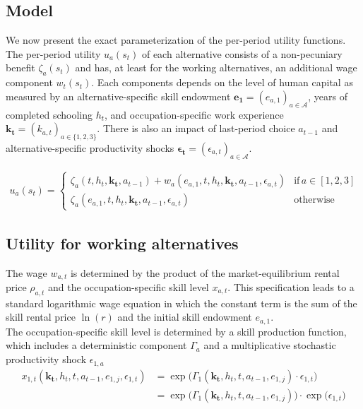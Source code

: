 \subsection{Model}\label{Appendix model}
We now present the exact parameterization of the per-period utility functions. The per-period utility $u_a(s_t)$ of each alternative consists of a non-pecuniary benefit $\zeta_a(s_t)$ and has, at least for the working alternatives, an additional wage component $w_t(s_t)$. Each components depends on the level of human capital as measured by an alternative-specific skill endowment $\bm{e_1} = \left(e_{a,1}\right)_{a\in\mathcal{A}}$, years of completed schooling $h_t$, and occupation-specific work experience $\bm{k_t} = \left(k_{a,t}\right)_{a\in\{1, 2, 3\}}$. There is also an impact of last-period choice $a_{t -1}$ and alternative-specific productivity shocks
$\bm{\epsilon_t} = \left(\epsilon_{a,t}\right)_{a\in\mathcal{A}}$.

\begin{align*}
u_a(s_t) =
\begin{cases}
    \zeta_a(t, h_t, \bm{k_t}, a_{t -1})  + w_a(e_{a,1}, t, h_t, \bm{k_t}, a_{t -1}, \epsilon_{a,t})              & \text{if}\, a \in [1, 2, 3]  \\
    \zeta_a(e_{a,1}, t, h_t, \bm{k_t}, a_{t -1}, \epsilon_{a,t})                                    & \text{otherwise}
\end{cases}
\end{align*}
\subsection{Utility for working alternatives}
The wage $w_{a,t}$ is determined by the product of the market-equilibrium rental price $\rho_{a,t}$ and the occupation-specific skill level $x_{a,t}$. This specification leads to a standard logarithmic wage equation in which the constant term is the sum of the skill rental price $\ln(r)$ and the initial skill endowment $e_{a,1}$.\\

The occupation-specific skill level is determined by a skill production function, which includes a deterministic component $\Gamma_a$ and a multiplicative stochastic productivity shock $\epsilon_{1,a}$
%
\begin{align}\label{eq:WhiteCollarSkillLevel}
    x_{1,t}(\bm{k_t}, h_t, t, a_{t-1}, e_{1,j}, \epsilon_{1,t}) & = \exp \big( \Gamma_{1}(\bm{k_t},  h_t, t, a_{t-1}, e_{1,j}) \cdot \epsilon_{1,t} \big) \\\nonumber
                & = \exp \big( \Gamma_1(\bm{k_t},  h_t, t, a_{t-1}, e_{1,j}) \big) \cdot \exp \big( \epsilon_{1,t} \big)
\end{align}
